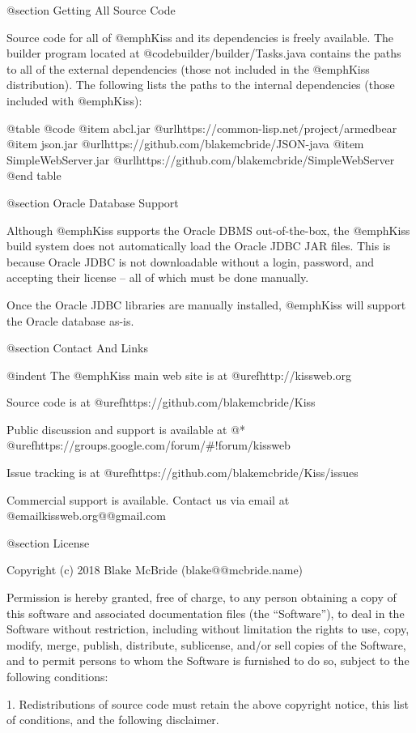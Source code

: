 @section Getting All Source Code

Source code for all of @emph{Kiss} and its dependencies is freely
available.  The builder program located at
@code{builder/builder/Tasks.java} contains the paths to all of the
external dependencies (those not included in the @emph{Kiss}
distribution).  The following lists the paths to the internal
dependencies (those included with @emph{Kiss}):

@table @code
@item abcl.jar
@url{https://common-lisp.net/project/armedbear}
@item json.jar
@url{https://github.com/blakemcbride/JSON-java}
@item SimpleWebServer.jar
@url{https://github.com/blakemcbride/SimpleWebServer}
@end table

@section Oracle Database Support

Although @emph{Kiss} supports the Oracle DBMS out-of-the-box, the
@emph{Kiss} build system does not automatically load the Oracle JDBC
JAR files.  This is because Oracle JDBC is not downloadable without a
login, password, and accepting their license -- all of which must be
done manually.

Once the Oracle JDBC libraries are manually installed, @emph{Kiss}
will support the Oracle database as-is.

@section Contact And Links

@indent
The @emph{Kiss} main web site is at @uref{http://kissweb.org}

Source code is at @uref{https://github.com/blakemcbride/Kiss}

Public discussion and support is available at @* @uref{https://groups.google.com/forum/#!forum/kissweb}

Issue tracking is at @uref{https://github.com/blakemcbride/Kiss/issues}

Commercial support is available.  Contact us via email at @email{kissweb.org@@gmail.com}

@section License

Copyright (c) 2018 Blake McBride (blake@@mcbride.name)

Permission is hereby granted, free of charge, to any person obtaining
a copy of this software and associated documentation files (the
``Software''), to deal in the Software without restriction, including
without limitation the rights to use, copy, modify, merge, publish,
distribute, sublicense, and/or sell copies of the Software, and to
permit persons to whom the Software is furnished to do so, subject to
the following conditions:

1. Redistributions of source code must retain the above copyright
notice, this list of conditions, and the following disclaimer.


